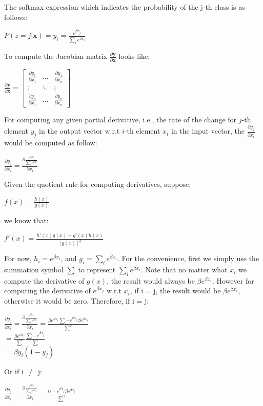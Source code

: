 \documentclass[12pt]{article}
\begin{document}
The softmax expression which indicates the probability of the j-th class is as follows:
\begin{center}
    $P(z=j|\mathbf{x}) = y_{i} = \frac{e^{\beta x_{j}}}{\sum_{i}e^{\beta x_{i}}}$
\end{center}To compute the Jacobian matrix $\frac{\partial \mathbf{y}}{\partial \mathbf{x}}$ looks like:
\begin{center}
    $
    \frac{\partial \mathbf{y}}{\partial \mathbf{x}}=
        \left[\begin{matrix}
        \frac{\partial y_{1}}{\partial x_{1}} & \dots & \frac{\partial y_{1}}{\partial x_{n}} \\
        \vdots & \ddots & \vdots \\
        \frac{\partial y_{n}}{\partial x_{1}} & \dots & \frac{\partial y_{n}}{\partial x_{n}}
        \end{matrix}\right]
    $
\end{center}For computing any given partial derivative, i.e., the rate of the change for $j$-th element $y_{j}$ in the output vector w.r.t $i$-th element $x_{i}$ in the input vector, the $\frac{\partial y_{j}}{\partial x_{i}}$ would be computed as follow:
\begin{center}
    $
    \frac{\partial y_{j}}{\partial x_{i}}=
    \frac{\partial \frac{e^{\beta x_{j}}}{\sum_{i}e^{\beta x_{i}}}}{\partial x_{i}}
    $
\end{center}Given the quotient rule for computing derivatives, suppose:
\begin{center}
    $
    f(x) = \frac{h(x)}{g(x)}
    $
\end{center}we know that:
\begin{center}
    $
    f'(x) = \frac{h'(x)g(x)-g'(x)h(x)}{[g(x)]^2}
    $
\end{center}For now, $h_i = e^{\beta x_{i}}$, and $g_i = \sum_{i}e^{\beta x_{i}}$. For the convenience, first we simply use the summation symbol $\sum$ to represent $\sum_{i}e^{\beta x_{i}}$. Note that no matter what $x_{i}$ we compute the derivative of $g(x)$, the result would always be $\beta e^{\beta x_{i}}$. However for computing the derivative of $e^{\beta x_{j}}$ w.r.t $x_{i}$, if i = j, the result would be $\beta e^{\beta x_{i}}$, otherwise it would be zero.
\newline\indent Therefore, if i = j:
\begin{center}
    $
    \frac{\partial y_{j}}{\partial x_{i}}=
    \frac{\partial \frac{e^{\beta x_{j}}}{\sum_{i}e^{\beta x_{i}}}}{\partial x_{i}}=
    \frac{\beta e^{\beta x_{i}}\sum - e^{\beta x_{j}}\beta e^{\beta x_{i}}}{\sum^2}
    $\\
    $
    =\frac{\beta e^{\beta x_{i}}}{\sum}\frac{\sum - e^{\beta x_{j}}}{\sum}
    $\\
    $
    = \beta y_{i}(1-y_{j})
    $
\end{center}Or if i $\neq$ j:
\begin{center}
    $
     \frac{\partial y_{j}}{\partial x_{i}}=
    \frac{\partial \frac{e^{\beta x_{j}}}{\sum_{i}e^{\beta x_{i}}}}{\partial x_{i}}=
    \frac{0 - e^{\beta x_{j}}\beta e^{\beta x_{i}}}{\sum^2}  
    $
\end{center}
\end{document}

